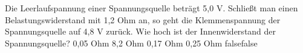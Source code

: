    {Die Leerlaufspannung einer Spannungsquelle beträgt 5,0 V. Schließt man einen Belastungswiderstand mit 1,2 Ohm an, so geht die Klemmenspannung der Spannungsquelle auf 4,8 V zurück. Wie hoch ist der Innenwiderstand der Spannungsquelle?}
    {0,05 Ohm}
    {8,2 Ohm}
    {0,17 Ohm}
    {0,25 Ohm}
    {false}{false}